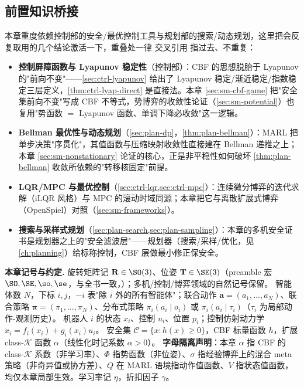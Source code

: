 \subsection*{前置知识桥接}
本章重度依赖控制部的安全/最优控制工具与规划部的搜索/动态规划，这里把会反复取用的几个结论激活一下，重叠处一律 交叉引用 指过去、不重复：

\begin{itemize}
  \item \textbf{控制屏障函数与 Lyapunov 稳定性}（控制部）：CBF 的思想脱胎于 Lyapunov 的"前向不变"——\cref{sec:ctrl-lyapunov} 给出了 Lyapunov 稳定/渐近稳定/指数稳定三层定义，\cref{thm:ctrl-lyap-direct} 是直接法。本章 \cref{sec:sm-cbf-game} 把"安全集前向不变"写成 CBF 不等式，势博弈的收敛性论证（\cref{sec:sm-potential}）也复用"势函数 $=$ Lyapunov 函数、单调下降必收敛"这一逻辑。
  \item \textbf{Bellman 最优性与动态规划}（\cref{sec:plan-dp}，\cref{thm:plan-bellman}）：MARL 把单步决策"序贯化"，其值函数与压缩映射收敛性直接建在 Bellman 递推之上；本章 \cref{sec:sm-nonstationary} 论证的核心，正是非平稳性如何破坏 \cref{thm:plan-bellman} 收敛所依赖的"转移核固定"前提。
  \item \textbf{LQR/MPC 与最优控制}（\cref{sec:ctrl-lqr,sec:ctrl-mpc}）：连续微分博弈的迭代求解（iLQR 风格）与 MPC 的滚动时域同源；本章把它与离散扩展式博弈（OpenSpiel）对照（\cref{sec:sm-frameworks}）。
  \item \textbf{搜索与采样式规划}（\cref{sec:plan-search,sec:plan-sampling}）：本章的多机安全证书是规划器之上的"安全滤波层"——规划器（搜索/采样/优化，见 \cref{ch:planning}）给标称控制，CBF 层做最小修正保安全。
\end{itemize}

\begin{note}
\textbf{本章记号与约定.}\;
旋转矩阵记 $\mathbf{R}\in\SO(3)$、位姿 $\mathbf{T}\in\SE(3)$（preamble 宏 $\SO,\SE,\so,\se$，与全书一致，）；多机/控制/博弈领域的自然记号保留。
智能体数 $N$，下标 $i,j$，$-i$ 表"除 $i$ 外的所有智能体"；联合动作 $\mathbf{a}=(a_1,\dots,a_N)$、联合策略 $\boldsymbol{\pi}=(\pi_1,\dots,\pi_N)$、分布式策略 $\pi_i(a_i\mid o_i)$ 或 $\pi_i(a_i\mid\tau_i)$（$\tau_i$ 为局部动作-观测历史）。
机器人 $i$ 的状态 $x_i$、控制 $u_i$、位置 $p_i$；控制仿射动力学 $\dot x_i=f_i(x_i)+g_i(x_i)u_i$。
安全集 $\mathcal{C}=\{x:h(x)\ge0\}$，CBF 标量函数 $h$，扩展 class-$\mathcal{K}$ 函数 $\alpha$（线性化时记系数 $\alpha>0$）。
\textbf{字母隔离声明}：本章 $\alpha$ 指 CBF 的 class-$\mathcal{K}$ 系数（非学习率）、$\Phi$ 指势函数（非位姿）、$\sigma$ 指经验博弈上的混合 meta 策略（非奇异值或协方差）、$Q$ 在 MARL 语境指动作值函数、$V$ 指状态值函数，均仅本章局部生效。学习率记 $\eta$，折扣因子 $\gamma$。
\end{note}

